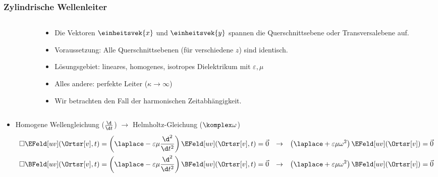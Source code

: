 \begin{frame}
  \frametitle{Zylindrische Wellenleiter}
  \begin{columns}
    \begin{column}{.3\linewidth}
  \end{column}
  \begin{column}{.7\linewidth}
      \begin{itemize}[<+->]
      \item Die Vektoren \(\einheitsvek{x}\) und \(\einheitsvek{y}\) spannen die \alert{Querschnittsebene} oder \alert{Transversalebene} auf.
      \item Voraussetzung: Alle Querschnittsebenen (für verschiedene \(z\)) sind identisch.
      \item Lösungsgebiet: lineares, homogenes, isotropes Dielektrikum mit \(\varepsilon, \mu\)
      \item Alles andere: perfekte Leiter (\(\kappa \to \infty\))
        \item Wir betrachten den Fall der \alert{harmonischen Zeitabhängigkeit}.
        \end{itemize}
  \end{column}
    \end{columns}
      \begin{itemize}[<+->]
      \item Homogene Wellengleichung (\(\frac{\d}{\d t}\)) \(\to\) \alert{Helmholtz-Gleichung} (\(\komplex\omega\))
        \begin{align*}
          \square \EFeld[uv](\Ortsr[v], t) = \left(\laplace - \varepsilon\mu\frac{\d^2}{\d t^2}\right) \EFeld[uv] (\Ortsr[v], t) = \vec{0} &&\rightarrow  &&\left(\laplace + \varepsilon\mu\omega^2\right) \EFeld[uv](\Ortsr[v]) =\vec{0} \\
          \square \BFeld[uv](\Ortsr[v], t) = \left(\laplace - \varepsilon\mu\frac{\d^2}{\d t^2}\right) \BFeld[uv] (\Ortsr[v], t) = \vec{0} &&\rightarrow  &&\left(\laplace + \varepsilon\mu\omega^2\right) \BFeld[uv](\Ortsr[v]) =\vec{0} 
        \end{align*}
        \end{itemize}
\end{frame}


